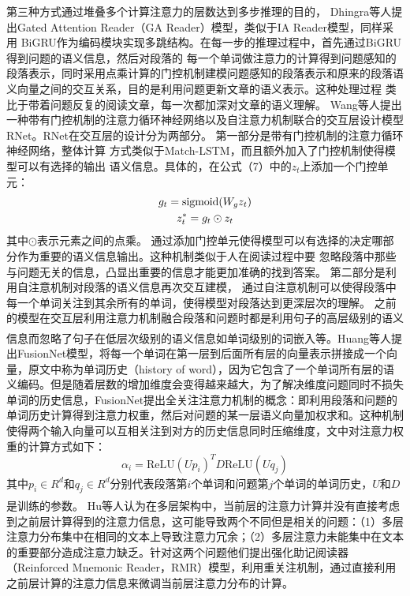 \documentclass{article}
\newcommand{\upcite}[1]{\textsuperscript{\textsuperscript{\cite{#1}}}}
\begin{document}
\noindent
第三种方式通过堆叠多个计算注意力的层数达到多步推理的目的，
Dhingra等人\cite{GAReader}提出Gated Attention Reader（GA Reader）模型，类似于IA Reader模型，同样采用
BiGRU作为编码模块实现多跳结构。在每一步的推理过程中，首先通过BiGRU得到问题的语义信息，然后对段落的
每一个单词做注意力的计算得到问题感知的段落表示，同时采用点乘计算的门控机制建模问题感知的段落表示和原来的段落语义向量之间的交互关系，目的是利用问题更新文章的语义表示。这种处理过程
类比于带着问题反复的阅读文章，每一次都加深对文章的语义理解。
Wang等人\cite{RNet}提出一种带有门控机制的注意力循环神经网络以及自注意力机制联合的交互层设计模型RNet。RNet在交互层的设计分为两部分。
第一部分是带有门控机制的注意力循环神经网络，整体计算
方式类似于Match-LSTM，而且额外加入了门控机制使得模型可以有选择的输出
语义信息。具体的，在公式（7）中的$z_t$上添加一个门控单元：
\begin{gather}
g_t=\text{sigmoid}(W_gz_t)\notag \\
z_t^{*}=g_t\odot z_t
\end{gather}
其中$\odot$表示元素之间的点乘。
通过添加门控单元使得模型可以有选择的决定哪部分作为重要的语义信息输出。这种机制类似于人在阅读过程中要
忽略段落中那些与问题无关的信息，凸显出重要的信息才能更加准确的找到答案。
第二部分是利用自注意机制对段落的语义信息再次交互建模，
通过自注意机制可以使得段落中每一个单词关注到其余所有的单词，使得模型对段落达到更深层次的理解。
之前的模型在交互层利用注意力机制融合段落和问题时都是利用句子的高层级别的语义信息而忽略了句子在低层次级别的语义信息如单词级别的词嵌入等。Huang等人\upcite{Fusionnet}提出FusionNet模型，将每一个单词在第一层到后面所有层的向量表示拼接成一个向量，原文中称为单词历史（history of word），因为它包含了一个单词所有层的语义编码。但是随着层数的增加维度会变得越来越大，为了解决维度问题同时不损失单词的历史信息，FusionNet提出全关注注意力机制的概念：即利用段落和问题的单词历史计算得到注意力权重，然后对问题的某一层语义向量加权求和。这种机制使得两个输入向量可以互相关注到对方的历史信息同时压缩维度，文中对注意力权重的计算方式如下：
\begin{equation}
\alpha_i=\text{ReLU}(Up_i)^TD\text{ReLU}(Uq_j)
\end{equation}
其中$p_i\in R^d$和$q_j\in R^d$分别代表段落第$i$个单词和问题第$j$个单词的单词历史，$U$和$D$是训练的参数。
%
Hu等人\upcite{RMR}认为在多层架构中，当前层的注意力计算并没有直接考虑到之前层计算得到的注意力信息，这可能导致两个不同但是相关的问题：（1）多层注意力分布集中在相同的文本上导致注意力冗余；（2）多层注意力未能集中在文本的重要部分造成注意力缺乏。针对这两个问题他们提出强化助记阅读器（Reinforced Mnemonic Reader，RMR）模型，利用重关注机制，通过直接利用之前层计算的注意力信息来微调当前层注意力分布的计算。
\end{document}
